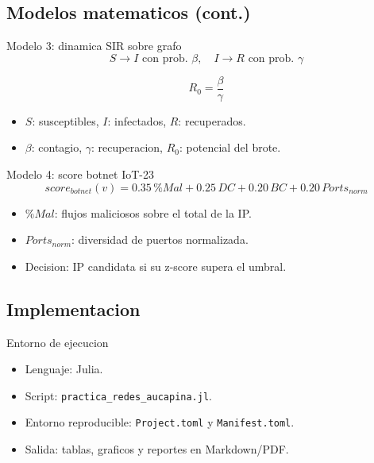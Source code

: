 \subsection{Modelos matematicos
(cont.)}\label{modelos-matematicos-cont.}

\begin{frame}{Modelo 3: dinamica SIR sobre grafo}
\protect{}\label{modelo-3-dinamica-sir-sobre-grafo}
\[
S \rightarrow I \text{ con prob. } \beta, \quad I \rightarrow R \text{ con prob. } \gamma
\]

\[
R_0=\frac{\beta}{\gamma}
\]

\begin{itemize}
\tightlist
\item
  \(S\): susceptibles, \(I\): infectados, \(R\): recuperados.
\item
  \(\beta\): contagio, \(\gamma\): recuperacion, \(R_0\): potencial del
  brote.
\end{itemize}
\end{frame}

\begin{frame}{Modelo 4: score botnet IoT-23}
\protect{}\label{modelo-4-score-botnet-iot-23}
\[
score_{botnet}(v)=0.35\,\%{}Mal+0.25\,DC+0.20\,BC+0.20\,Ports_{norm}
\]

\begin{itemize}
\tightlist
\item
  \(\%{}Mal\): flujos maliciosos sobre el total de la IP.
\item
  \(Ports_{norm}\): diversidad de puertos normalizada.
\item
  Decision: IP candidata si su z-score supera el umbral.
\end{itemize}
\end{frame}

\subsection{Implementacion}\label{implementacion}

\begin{frame}[fragile]{Entorno de ejecucion}
\protect{}\label{entorno-de-ejecucion}
\begin{itemize}
\tightlist
\item
  Lenguaje: Julia.
\item
  Script: \texttt{practica\_redes\_aucapina.jl}.
\item
  Entorno reproducible: \texttt{Project.toml} y \texttt{Manifest.toml}.
\item
  Salida: tablas, graficos y reportes en Markdown/PDF.
\end{itemize}

\begin{Shaded}
\begin{Highlighting}[]
 \OperatorTok{=}\DataTypeTok{\textbackslash{}}
\end{Highlighting}
\end{Shaded}
\end{frame}

